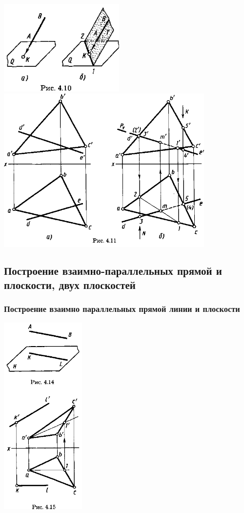 \documentclass[a4paper, 12pt]{article}
\begin{document}
\includegraphics{img/431.png}\\

\includegraphics{img/432.png}

\subsection{ Построение взаимно-параллельных прямой и плоскости, двух плоскостей}
\subsubsection{Построение взаимно параллельных прямой линии и плоскости}

\quad \quad \quad \quad \quad \quad \quad \includegraphics{img/441.png}\\
\end{document}
